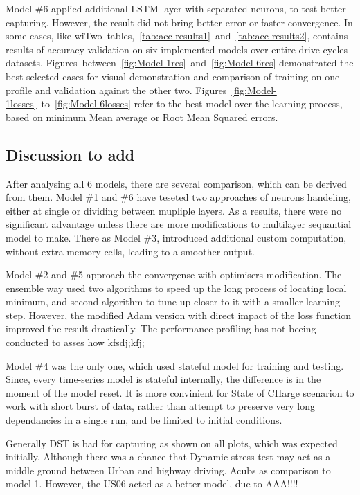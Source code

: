 %
%
Model \#6 applied additional LSTM layer with separated neurons, to test better capturing.
However, the result did not bring better error or faster convergence.
In some cases, like wi\mbox{Two tables, \ref{tab:acc-results1} and \ref{tab:acc-results2}}, contains results of accuracy validation on six implemented models over entire drive cycles datasets.
\mbox{Figures between \ref{fig:Model-1res} and \ref{fig:Model-6res}} demonstrated the best-selected cases for visual demonstration and comparison of training on one profile and validation against the other two.
\mbox{Figures \ref{fig:Model-1losses} to \ref{fig:Model-6losses}} refer to the best model over the learning process, based on minimum Mean average or Root Mean Squared errors.
%
\subsection{Discussion to add}
After analysing all 6 models, there are several comparison, which can be derived from them.
Model \#1 and \#6 have teseted two approaches of neurons handeling, either at single or dividing between mupliple layers.
As a results, there were no significant advantage unless there are more modifications to multilayer sequantial model to make.
There as Model \#3, introduced additional custom computation, without extra memory cells, leading to a smoother output.

%
%
Model \#2 and \#5 approach the convergense with optimisers modification.
The ensemble way used two algorithms to speed up the long process of locating local minimum, and second algorithm to tune up closer to it with a smaller learning step.
However, the modified Adam version with direct impact of the loss function improved the result drastically.
The performance profiling has not beeing conducted to asses how kfsdj;kfj;

%
Model \#4 was the only one, which used stateful model for training and testing.
Since, every time-series model is stateful internally, the difference is in the moment of the model reset.
It is more convinient for State of CHarge scenarion to work with short burst of data, rather than attempt to preserve very long dependancies in a single run, and be limited to initial conditions.

%
%
Generally DST is bad for capturing as shown on all plots, which was expected initially. Although there was a chance that Dynamic stress test may act as a middle ground between Urban and highway driving.
Acubs as comparison to model 1.
However, the US06 acted as a better model, due to AAA!!!!

